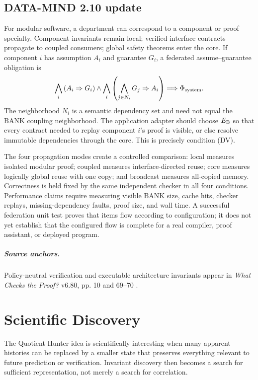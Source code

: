 \documentclass[11pt,oneside]{book}
\theoremstyle{definition}
\theoremstyle{remark}
\begin{document}
\section{DATA-MIND 2.10 update}
For modular software, a department can correspond to a component or proof specialty. Component
invariants remain local; verified interface contracts propagate to coupled consumers; global safety
theorems enter the core. If component \(i\) has assumption \(A_i\) and guarantee \(G_i\), a
federated assume--guarantee obligation is
\[
\bigwedge_i\left(A_i\Rightarrow G_i\right)
\land
\bigwedge_i\left(\bigwedge_{j\in N_i}G_j\Rightarrow A_i\right)
\Longrightarrow \Phi_{\rm system}.
\]
The neighborhood \(N_i\) is a semantic dependency set and need not equal the BANK coupling
neighborhood. The application adapter should choose \(E_{\rm B}\) so that every contract needed to
replay component \(i\)'s proof is visible, or else resolve immutable dependencies through the core.
This is precisely condition (DV).

The four propagation modes create a controlled comparison: local measures isolated modular proof;
coupled measures interface-directed reuse; core measures logically global reuse with one copy; and
broadcast measures all-copied memory. Correctness is held fixed by the same independent checker in
all four conditions. Performance claims require measuring visible BANK size, cache hits, checker
replays, missing-dependency faults, proof size, and wall time. A successful federation unit test proves
that items flow according to configuration; it does not yet establish that the configured flow is
complete for a real compiler, proof assistant, or deployed program.

\paragraph{Source anchors.} Policy-neutral verification and executable architecture invariants appear
in \emph{What Checks the Proof?} v6.80, pp. 10 and 69--70 \cite{TennesonChecks}.

\chapter{Scientific Discovery}
\label{ch:science}

The Quotient Hunter idea is scientifically interesting when many apparent histories can be replaced
by a smaller state that preserves everything relevant to future prediction or verification. Invariant
discovery then becomes a search for sufficient representation, not merely a search for correlation.
\end{document}
